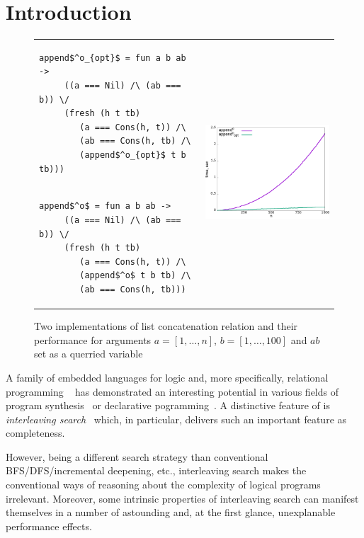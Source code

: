 \section{Introduction}
\label{sec:intro}

\begin{figure}[t]
\begin{tabular}{p{6cm}p{6cm}}
\begin{lstlisting}[basicstyle=\small]
   append$^o_{opt}$ = fun a b ab ->
     ((a === Nil) /\ (ab === b)) \/
     (fresh (h t tb)
        (a === Cons(h, t)) /\
        (ab === Cons(h, tb) /\
        (append$^o_{opt}$ t b tb)))
\end{lstlisting} & \multirow{2}{*}[-3mm]{\includegraphics[width=6cm,height=5cm]{append_without_oc.png}} \\[-9mm]
\begin{lstlisting}[basicstyle=\small]
   append$^o$ = fun a b ab ->
     ((a === Nil) /\ (ab === b)) \/
     (fresh (h t tb)
        (a === Cons(h, t)) /\
        (append$^o$ t b tb) /\
        (ab === Cons(h, tb)))
\end{lstlisting} &
\end{tabular}
\caption{Two implementations of list concatenation relation and their performance for arguments $a = [1,\dots,n]$, $b = [1,\dots,100]$ and $ab$ set as a querried variable}
\label{fig:length_implementations}
\end{figure}

A family of embedded languages for logic and, more specifically, relational programming \mK~\cite{TRS} has demonstrated an interesting potential in various fields of 
program synthesis~\cite{SevenProblems,Twines,Matching} or declarative pogramming~\cite{?}. A distinctive feature of \mK is \emph{interleaving search}~\cite{Transformers} which,
in particular, delivers such an important feature as completeness.

However, being a different search strategy than conventional BFS/DFS/incremental deepening, etc., interleaving search makes the conventional ways of reasoning about the complexity
of logical programs irrelevant. Moreover, some intrinsic properties of interleaving search can manifest themselves in a number of astounding and, at the first glance, unexplanable
performance effects. 

